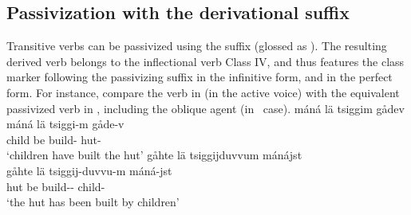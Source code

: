\subsection{Passivization with the derivational suffix }\label{VdervPassives}
Transitive verbs can be passivized using the suffix  (glossed as ). %
The resulting derived verb belongs to the inflectional verb Class IV, and thus features the class marker  following the passivizing suffix in the infinitive form, and  in the perfect form. 
For instance, compare the verb in  (in the active voice) with the equivalent passivized verb in , including the oblique agent (in \ELAT\ case). %
\ea\label{passEx2}%
\glll	máná lä tsiggim gådev\\
	máná lä tsiggi-m gåde-v\\
	child\BS{} be\BS{} build- hut-\\\nopagebreak
\trans	‘children have built the hut’	
\z
\ea\label{passEx3}%
\glll	gåhte lä tsiggijduvvum mánájst\\
	gåhte lä tsiggij-duvvu-m máná-jst\\
	hut\BS{} be\BS{} build-- child-\\\nopagebreak
\trans	‘the hut has been built by children’	
\z

